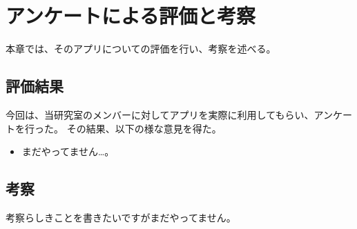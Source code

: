 \chapter{アンケートによる評価と考察}
\label{chap:result}

本章では、そのアプリについての評価を行い、考察を述べる。

\section{評価結果}
今回は、当研究室のメンバーに対してアプリを実際に利用してもらい、アンケートを行った。
その結果、以下の様な意見を得た。
\begin{itemize}
\item まだやってません…。
\end{itemize}



\section{考察}
考察らしきことを書きたいですがまだやってません。

